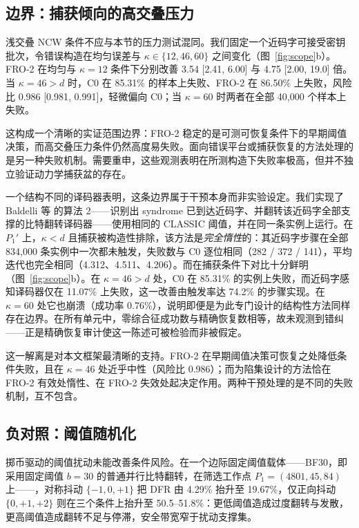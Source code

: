 \documentclass[UTF8,a4paper,10pt,twocolumn]{ctexart}
\begin{document}
\subsection{边界：捕获倾向的高交叠压力}\label{sec:boundary}

浅交叠 NCW 条件不应与本节的压力测试混同。我们固定一个近码字可接受密钥批次，令错误构造在均匀误差与 $\kappa\in\{12,46,60\}$ 之间变化（图~\ref{fig:scope}b）。FRO-2 在均匀与 $\kappa=12$ 条件下分别改善 3.54 [2.41, 6.00] 与 4.75 [2.00, 19.0] 倍。当 $\kappa=46>d$ 时，C0 在 85.31\% 的样本上失败、FRO-2 在 86.50\% 上失败，风险比 0.986 [0.981, 0.991]，轻微偏向 C0；当 $\kappa=60$ 时两者在全部 40{,}000 个样本上失败。

这构成一个清晰的实证范围边界：FRO-2 稳定的是可测可恢复条件下的早期阈值决策，而高交叠压力条件仍然高度易失败。面向错误平台或捕获恢复的方法处理的是另一种失败机制\cite{baldelli2026ncw,santini2026flip}。需要重申，这些观测表明在所测构造下失败率极高，但并不独立验证动力学捕获盆的存在。

一个结构不同的译码器表明，这条边界属于干预本身而非实验设定。我们实现了 Baldelli 等\cite{baldelli2026ncw} 的算法 2——识别出 syndrome 已到达近码字、并翻转该近码字全部支撑的比特翻转译码器——使用相同的 CLASSIC 阈值，并在同一条实例上运行。在 $P_1'$ 上，$\kappa<d$ 且捕获被构造性排除，该方法是\emph{完全惰性}的：其近码字步骤在全部 834{,}000 条实例中一次都未触发，失败数与 C0 逐位相同（282 / 372 / 141），平均迭代也完全相同（4.312、4.511、4.206）。而在捕获条件下对比十分鲜明（图~\ref{fig:scope}b）。在 $\kappa=46>d$ 处，C0 在 85.31\% 的实例上失败，而近码字感知译码器仅在 11.07\% 上失败，这一改善由触发率达 74.2\% 的步骤实现。在 $\kappa=60$ 处它也崩溃（成功率 0.76\%），说明即便是为此专门设计的结构性方法同样存在边界。在所有单元中，零综合征成功数与精确恢复数相等，故未观测到错纠——正是精确恢复审计使这一陈述可被检验而非被假定。

这一解离是对本文框架最清晰的支持。FRO-2 在早期阈值决策可恢复之处降低条件失败，且在 $\kappa=46$ 处近乎中性（风险比 0.986）；而为陷集设计的方法恰在 FRO-2 有效处惰性、在 FRO-2 失效处起决定作用。两种干预处理的是不同的失败机制，互不包含。

\subsection{负对照：阈值随机化}\label{sec:negative}

掷币驱动的阈值扰动未能改善条件风险。在一个边际固定阈值载体——BF30，即采用固定阈值 $b=30$ 的普通并行比特翻转，在筛选工作点 $P_1=(4801,45,84)$ 上——，对称抖动 $\{-1,0,+1\}$ 把 DFR 由 4.29\% 抬升至 19.67\%，仅正向抖动 $\{0,+1,+2\}$ 则在三个条件上抬升至 50.5--51.8\%：更低阈值造成过度翻转与发散，更高阈值造成翻转不足与停滞，安全带宽窄于扰动支撑集。
\end{document}
